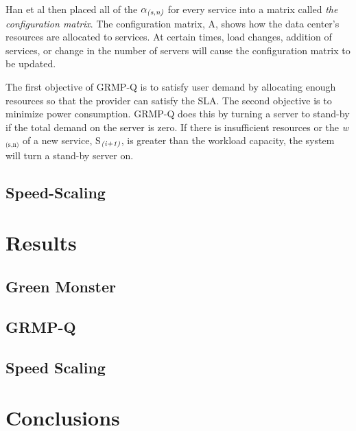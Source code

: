 \documentclass{sig-alternate}
\begin{document}
Han et al then placed all of the \emph{$\alpha_\emph{(s,n)}$} for every service into a matrix called \emph{the configuration matrix}. The configuration matrix, A, shows how the data center's resources are allocated to services. At certain times, load changes, addition of services, or change in the number of servers will cause the configuration matrix to be updated. 

The first objective of GRMP-Q is to satisfy user demand by allocating enough resources so that the provider can satisfy the SLA. The second objective is to minimize power consumption. GRMP-Q does this by turning a server to stand-by if the total demand on the server is zero. If there is insufficient resources or the \emph{w$_{\text{(s,n)}}$} of a new service, S$_{\text{\emph{(i+1)}}}$, is greater than the workload capacity, the system will turn a stand-by server on. 


\subsection{Speed-Scaling}
\label{sec:Speed}

\section{Results} 
\label{sec:results}
\subsection{Green Monster}
\label{sec:GM}
\subsection{GRMP-Q}
\label{sec:GRMP-Q}
\subsection{Speed Scaling}
\label{sec:SS}

\section{Conclusions} 
\label{sec:conclusion}





\pagebreak



\end{document}
